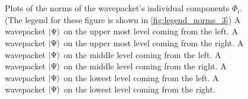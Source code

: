\begin{figure}
{  } \\
   \\
  \caption[Plots of the norms of the wavepacket's individual components $\Phi_i$.]{
    Plots of the norms of the wavepacket's individual components $\Phi_i$. (The legend for these figure
    is shown in \ref{fig:legend_norms_3})
     A wavepacket $\Ket{\Psi}$ on the upper most level coming from the left.
     A wavepacket $\Ket{\Psi}$ on the upper most level coming from the right.
     A wavepacket $\Ket{\Psi}$ on the middle level coming from the left.
     A wavepacket $\Ket{\Psi}$ on the middle level coming from the right.
     A wavepacket $\Ket{\Psi}$ on the lowest level coming from the left.
     A wavepacket $\Ket{\Psi}$ on the lowest level coming from the right.
    \label{fig:three_states_norms}
  }
\end{figure}
